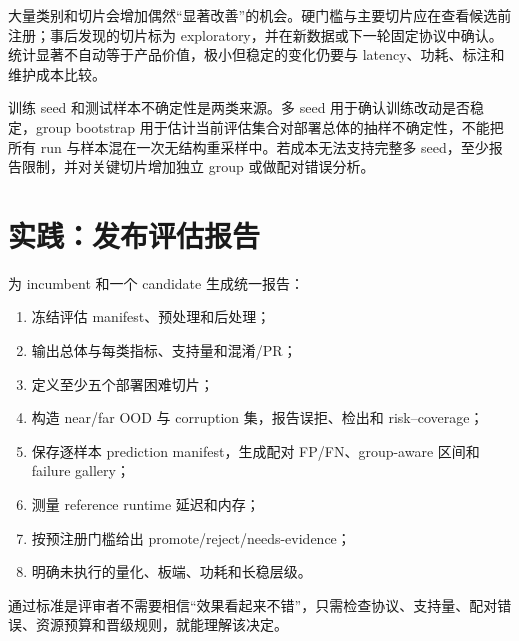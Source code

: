 大量类别和切片会增加偶然“显著改善”的机会。硬门槛与主要切片应在查看候选前注册；事后发现的切片标为 exploratory，并在新数据或下一轮固定协议中确认。统计显著不自动等于产品价值，极小但稳定的变化仍要与 latency、功耗、标注和维护成本比较。

训练 seed 和测试样本不确定性是两类来源。多 seed 用于确认训练改动是否稳定，group bootstrap 用于估计当前评估集合对部署总体的抽样不确定性，不能把所有 run 与样本混在一次无结构重采样中。若成本无法支持完整多 seed，至少报告限制，并对关键切片增加独立 group 或做配对错误分析。

\section{实践：发布评估报告}

为 incumbent 和一个 candidate 生成统一报告：

\begin{enumerate}
  \item 冻结评估 manifest、预处理和后处理；
  \item 输出总体与每类指标、支持量和混淆/PR；
  \item 定义至少五个部署困难切片；
  \item 构造 near/far OOD 与 corruption 集，报告误拒、检出和 risk--coverage；
  \item 保存逐样本 prediction manifest，生成配对 FP/FN、group-aware 区间和 failure gallery；
  \item 测量 reference runtime 延迟和内存；
  \item 按预注册门槛给出 promote/reject/needs-evidence；
  \item 明确未执行的量化、板端、功耗和长稳层级。
\end{enumerate}

通过标准是评审者不需要相信“效果看起来不错”，只需检查协议、支持量、配对错误、资源预算和晋级规则，就能理解该决定。
